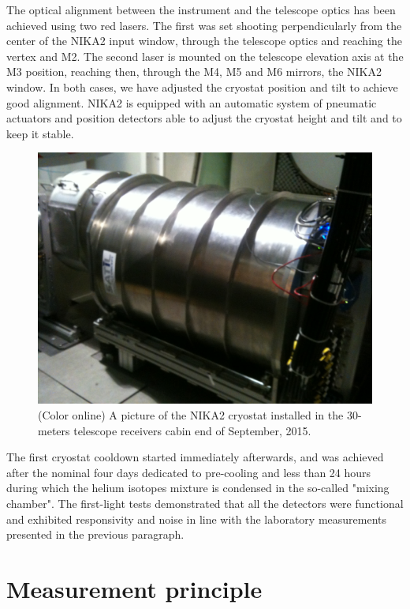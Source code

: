 \documentclass[]{aa} %
\begin{document}
The optical alignment between the instrument and the telescope optics has been achieved using two red lasers. The first was set shooting perpendicularly from the center of the NIKA2 input window, through the telescope optics and reaching the vertex and M2. The second laser is mounted on the telescope elevation axis at the M3 position, reaching then, through the M4, M5 and M6 mirrors, the NIKA2 window. In both cases, we have adjusted the cryostat position and tilt to achieve good alignment. NIKA2 is equipped with an automatic system of pneumatic actuators and position detectors able to adjust the cryostat height and tilt and to keep it stable. 

\begin{figure}[h]
   \centering
    \includegraphics[width=.85\linewidth]{NIKA2cryo.jpg}
      \caption{(Color online) A picture of the NIKA2 cryostat installed in the 30-meters telescope receivers cabin end of September, 2015.}
         \label{Fig5}
\end{figure}

The first cryostat cooldown started immediately afterwards, and was achieved after the nominal four days dedicated to pre-cooling and less than 24 hours during which the helium isotopes mixture is condensed in the so-called "mixing chamber". The first-light tests demonstrated that all the detectors were functional and exhibited responsivity and noise in line with the laboratory measurements presented in the previous paragraph. 






\section{Measurement principle}
\label{Measurement principle}
\end{document}
